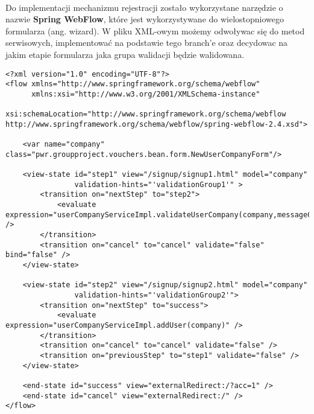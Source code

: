 \paragraph{}
Do implementacji mechanizmu rejestracji zostało wykorzystane narzędzie o nazwie \textbf{Spring WebFlow}, które jest wykorzystywane do wielostopniowego formularza (ang. wizard). W pliku XML-owym możemy odwoływac się do metod serwisowych, implementować na podstawie tego branch'e oraz decydowac na jakim etapie formularza jaka grupa walidacji będzie walidowana.
\begin{center}
\begin{lstlisting}[caption={Listing kodu odpowiedzialnego za rejestrację.},captionpos=b]
<?xml version="1.0" encoding="UTF-8"?>
<flow xmlns="http://www.springframework.org/schema/webflow"
      xmlns:xsi="http://www.w3.org/2001/XMLSchema-instance"
      xsi:schemaLocation="http://www.springframework.org/schema/webflow http://www.springframework.org/schema/webflow/spring-webflow-2.4.xsd">

    <var name="company" class="pwr.groupproject.vouchers.bean.form.NewUserCompanyForm"/>

    <view-state id="step1" view="/signup/signup1.html" model="company"
                validation-hints="'validationGroup1'" >
        <transition on="nextStep" to="step2">
            <evaluate expression="userCompanyServiceImpl.validateUserCompany(company,messageContext)" />
        </transition>
        <transition on="cancel" to="cancel" validate="false" bind="false" />
    </view-state>

    <view-state id="step2" view="/signup/signup2.html" model="company"
                validation-hints="'validationGroup2'">
        <transition on="nextStep" to="success">
            <evaluate expression="userCompanyServiceImpl.addUser(company)" />
        </transition>
        <transition on="cancel" to="cancel" validate="false" />
        <transition on="previousStep" to="step1" validate="false" />
    </view-state>

    <end-state id="success" view="externalRedirect:/?acc=1" />
    <end-state id="cancel" view="externalRedirect:/" />
</flow>
\end{lstlisting}
\end{center}
